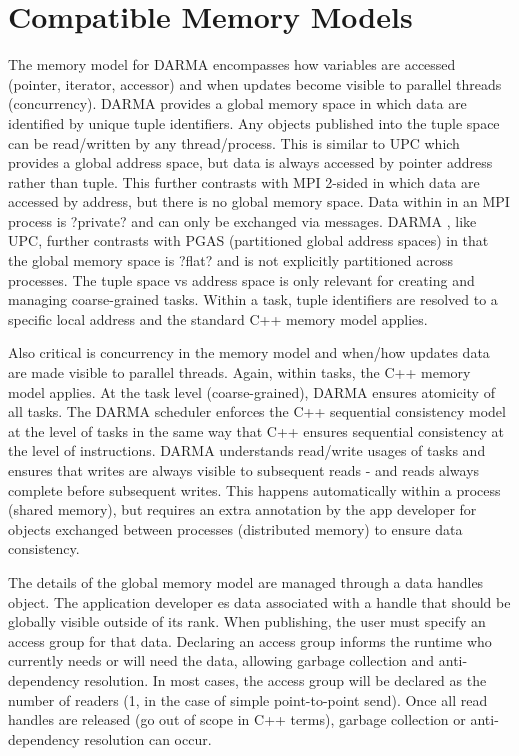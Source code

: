 
\section{Compatible Memory Models}
\label{sec:mem_model}

The memory model for DARMA encompasses how variables are accessed (pointer, iterator, accessor) and when updates become visible to parallel threads (concurrency).  
DARMA provides a global memory space in which data are identified by unique tuple identifiers.  
Any objects published into the tuple space can be read/written by any thread/process. 
This is similar to UPC which provides a global address space, but data is always accessed by pointer address rather than tuple. 
This further contrasts with MPI 2-sided in which data are accessed by address, but there is no global memory space.  
Data within in an MPI process is ?private? and can only be exchanged via messages.  
DARMA , like UPC, further contrasts with PGAS (partitioned global address spaces) in that the global memory space is ?flat? and is not explicitly partitioned across processes.
The tuple space vs address space is only relevant for creating and managing coarse-grained tasks. 
Within a task, tuple identifiers are resolved to a specific local address and the standard C++ memory model applies.

Also critical is concurrency in the memory model and when/how updates data are made visible to parallel threads.  
Again, within tasks, the C++ memory model applies.  
At the task level (coarse-grained), DARMA ensures atomicity of all tasks. 
The DARMA scheduler enforces the C++ sequential consistency model at the level of tasks in the same way that C++ ensures sequential consistency at the level of instructions. 
DARMA understands read/write usages of tasks and ensures that writes are always visible to subsequent reads - and reads always complete before subsequent writes.  
This happens automatically within a process (shared memory), but requires an extra annotation by the app developer for objects exchanged between processes (distributed memory) to ensure data consistency.

The details of the global memory model are managed through a data \glspl{handle} object.  
The application developer es data associated with a handle that should be globally visible
outside of its \gls{rank}.  
When publishing, the user must specify an \gls{access group} for that data.  
Declaring an access group informs the runtime who currently needs or will need the data,  
allowing garbage collection and \gls{anti-dependency} resolution.
In most cases, the access group will be declared as the number of readers (1, in the case of simple point-to-point send).
Once all read handles are released (go out of scope in C++ terms), garbage collection or anti-dependency resolution can occur.





